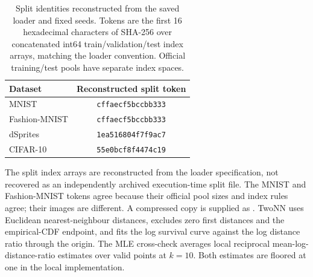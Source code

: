 \documentclass[make,article,submit,pdftex,moreauthors]{Definitions/mdpi}
\begin{document}
\begin{table}[H]
\caption{Split identities reconstructed from the saved loader and fixed seeds. Tokens are the first 16 hexadecimal characters of SHA-256 over concatenated int64 train/validation/test index arrays, matching the loader convention. Official training/test pools have separate index spaces.}\label{tab:splits}
\small
\setlength{\tabcolsep}{3.5pt}
\begin{tabular*}{\textwidth}{@{\extracolsep{\fill}}lc@{}}
\toprule
Dataset & Reconstructed split token \\
\midrule
MNIST & \texttt{cffaecf5bccbb333} \\
Fashion-MNIST & \texttt{cffaecf5bccbb333} \\
dSprites & \texttt{1ea516804f7f9ac7} \\
CIFAR-10 & \texttt{55e0bcf8f4474c19} \\
\bottomrule
\end{tabular*}
\end{table}

The split index arrays are reconstructed from the loader specification,
not recovered as an independently archived execution-time split file.
The MNIST and Fashion-MNIST tokens agree because their official pool
sizes and index rules agree; their images are different. A compressed
copy is supplied as .
TwoNN uses Euclidean nearest-neighbour distances, excludes zero first
distances and the empirical-CDF endpoint, and fits the log survival
curve against the log distance ratio through the origin. The MLE
cross-check averages local reciprocal mean-log-distance-ratio estimates
over valid points at $k=10$. Both estimates are floored at one in the
local implementation.
\end{document}
